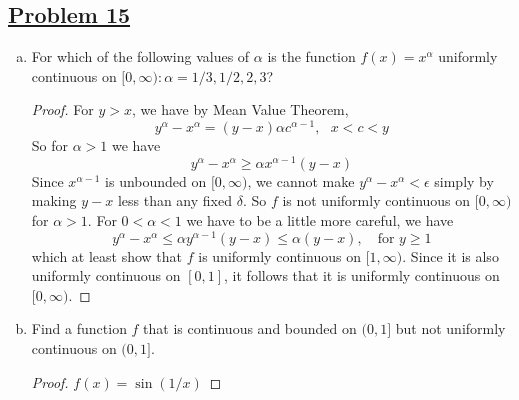 \documentclass[10pt,letterpaper]{article}
\begin{document}
	\subsection*{{\color{purple}\underline{Problem 15}}}
	\begin{enumerate}[(a)]	
	\item For which of the following values of $\alpha$ is the function $f(x) = x^{\alpha}$ uniformly continuous on $[0, \infty): \alpha = 1/3, 1/2, 2, 3$?
	\begin{proof}
		For $y > x$, we have by Mean Value Theorem,
		$$y^{\alpha} - x^{\alpha} = (y - x)\alpha c^{\alpha - 1}, \, \, \, \, x < c < y$$
		So for $\alpha > 1$ we have
		$$y^{\alpha} - x^{\alpha} \geq \alpha x^{\alpha - 1}(y - x)$$
		Since $x^{\alpha - 1}$ is unbounded on $[0, \infty)$, we cannot make $y^{\alpha} - x^{\alpha} < \epsilon$ simply by making 
		$y - x$ less than any fixed $\delta$. So $f$ is not uniformly continuous on $[0, \infty)$ for $\alpha > 1$. For $0 < \alpha < 1$ we have
		to be a little more careful, we have
		$$y^{\alpha} - x^{\alpha} \leq \alpha y^{\alpha - 1}(y - x) \leq \alpha (y - x), \, \, \, \, \text{ for } y \geq 1$$
		which at least show that $f$ is uniformly continuous on $[1, \infty)$. Since it is also uniformly continuous on $[0, 1]$,
		it follows that it is uniformly continuous on $[0, \infty)$. 
	\end{proof}

	\item Find a function $f$ that is continuous and bounded on $(0, 1]$ but not uniformly continuous on $(0, 1]$.
	\begin{proof}
		$f(x) = \sin(1/x)$
	\end{proof}
	\end{enumerate}
	
\end{document}
